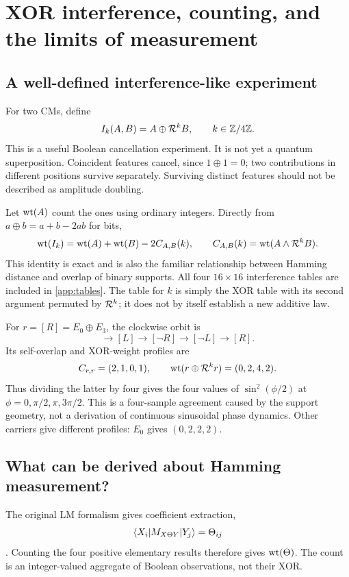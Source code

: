 \section{XOR interference, counting, and the limits of measurement}\label{sec:boolean}
\subsection{A well-defined interference-like experiment}
For two CMs, define
\begin{equation}
 I_k(A,B)=A\oplus\mathcal R^kB,\qquad k\in\mathbb Z/4\mathbb Z.
\end{equation}
This is a useful Boolean cancellation experiment. It is not yet a quantum superposition. Coincident features cancel, since $1\oplus1=0$; two contributions in different positions survive separately. Surviving distinct features should not be described as amplitude doubling.

Let $\operatorname{wt}(A)$ count the ones using ordinary integers. Directly from $a\oplus b=a+b-2ab$ for bits,
\begin{equation}\label{eq:xorweight}
 \operatorname{wt}(I_k)=\operatorname{wt}(A)+\operatorname{wt}(B)-2C_{A,B}(k),\qquad
 C_{A,B}(k)=\operatorname{wt}(A\land\mathcal R^kB).
\end{equation}
This identity is exact and is also the familiar relationship between Hamming distance and overlap of binary supports. All four $16\times16$ interference tables are included in \cref{app:tables}. The table for $k$ is simply the XOR table with its second argument permuted by $\mathcal R^k$; it does not by itself establish a new additive law.

For $r=[R]=E_0\oplus E_3$, the clockwise orbit is
\begin{equation}
 [R]\longrightarrow[L]\longrightarrow[\neg R]\longrightarrow[\neg L]\longrightarrow[R].
\end{equation}
Its self-overlap and XOR-weight profiles are
\begin{equation}
 C_{r,r}=(2,1,0,1),\qquad \operatorname{wt}(r\oplus\mathcal R^kr)=(0,2,4,2).
\end{equation}
Thus dividing the latter by four gives the four values of $\sin^2(\phi/2)$ at $\phi=0,\pi/2,\pi,3\pi/2$. This is a four-sample agreement caused by the support geometry, not a derivation of continuous sinusoidal phase dynamics. Other carriers give different profiles: $E_0$ gives $(0,2,2,2)$.

\subsection{What can be derived about Hamming measurement?}
The original LM formalism gives coefficient extraction,
\begin{equation}
 \langle X_i\rvert M_{X\Theta Y}\lvert Y_j\rangle=\Theta_{ij}
\end{equation}
\cite[Section 4.1.4]{droncheff}. Counting the four positive elementary results therefore gives $\operatorname{wt}(\Theta)$. The count is an integer-valued aggregate of Boolean observations, not their XOR.

